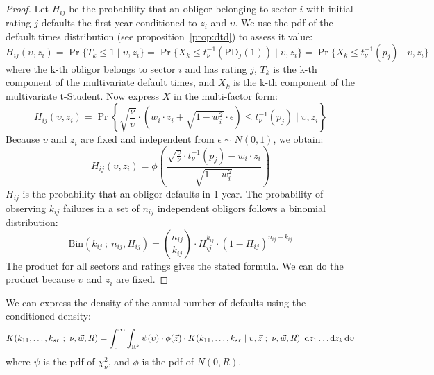 \documentclass[11pt,fleqn]{book} %
\begin{document}
\begin{proof}
	Let $H_{ij}$ be the probability that an obligor belonging to sector $i$
	with initial rating $j$ defaults the first year conditioned to $z_i$ 
	and $\upsilon$. We use the pdf of the default times distribution (see 
	proposition~\ref{prop:dtd}) to assess it value:
	\begin{displaymath}
		H_{ij}(\upsilon,z_i) = 
		\Pr\{T_k \le 1 \mid \upsilon, z_i\} = 
		\Pr\{ X_k \le t_{\nu}^{-1}(\text{PD}_j(1)) \mid \upsilon, z_i\} = 
		\Pr\{ X_k \le t_{\nu}^{-1}(p_j) \mid \upsilon, z_i\}
	\end{displaymath}
	where the k-th obligor belongs to sector $i$ and has rating $j$, 
	$T_k$ is the k-th component of the multivariate default 
	times, and $X_k$ is the k-th component of the multivariate t-Student. 
	Now express $X$ in the multi-factor form:
	\begin{displaymath}
		H_{ij}(\upsilon,z_i) = \Pr \left\{ 
		\sqrt{\frac{\nu}{\upsilon}} \cdot \left( w_i \cdot z_i + \sqrt{1-w_i^2} \cdot \epsilon\right)
		\le t_{\nu}^{-1}(p_j) \mid \upsilon, z_i
		\right\}
	\end{displaymath}
	Because $\upsilon$ and $z_i$ are fixed and independent from $\epsilon \sim N(0,1)$, we obtain:
	\begin{displaymath}
		H_{ij}(\upsilon,z_i) = \phi\left(  
		\frac{\sqrt{\frac{\upsilon}{\nu}} \cdot t_{\nu}^{-1}(p_j) - w_i\cdot z_i}{\sqrt{1-w_i^2}}
		\right)
	\end{displaymath}
	$H_{ij}$ is the probability that an obligor defaults in 1-year. The 
	probability of observing $k_{ij}$ failures in a set of $n_{ij}$ independent
	obligors follows a binomial distribution:
	\begin{displaymath}
		\text{Bin}(k_{ij}\ ;\ n_{ij},H_{ij}) = 
		\binom{n_{ij}}{k_{ij}} \cdot H_{ij}^{k_{ij}} \cdot (1-H_{ij})^{n_{ij}-k_{ij}}
	\end{displaymath}
	The product for all sectors and ratings gives the stated formula. 
	We can do the product because $\upsilon$ and $z_i$ are fixed.
\end{proof}

\begin{corollary}
	We can express the density of the annual number of defaults using 
	the conditioned density:
	\begin{displaymath}
			K(k_{11},\dots,k_{sr}\ ;\ \nu, \vec{w}, R) = %
			\displaystyle \int_0^{\infty} \int_{\mathbb{R}^k}
			\psi(\upsilon) \cdot \phi(\vec{z}) \cdot
			K(k_{11},\dots,k_{sr} \mid \upsilon,\vec{z}\ ;\ \nu,\vec{w}, R) 
			\ \ud z_1 \dots \ud z_k \ud \upsilon
	\end{displaymath}
	where $\psi$ is the pdf of $\chi_{\nu}^2$, and $\phi$ is the pdf of $N(0,R)$.
\end{corollary}
\end{document}
